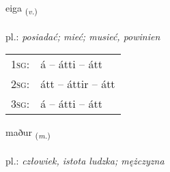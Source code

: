 \documentclass[frontgrid, backgrid]{flacards}\usepackage[]{graphicx}\usepackage[]{xcolor}
\begin{document}
{eiga \small{\textsubscript{(\textit{v.})}} \\[1ex] %
\textphonetic{[eiːɣa]} \\
pl.: \emph{posiadać; mieć; musieć, powinien} \\  [2ex]
\renewcommand*{\arraystretch}{0.8}
\begin{tabular}{p{1cm}l}
\textsc{1sg}: & á -- átti -- átt \\ 
\textsc{2sg}: & átt -- áttir -- átt \\ 
\textsc{3sg}: & á -- átti -- átt \\ 
\end{tabular}
}

\renewcommand{\flhead}{\vskip5pt \fboxsep=0pt {\small\bfseries\footnotesize Nafnorð | Noun}}
\renewcommand{\fcfoot}{\vskip5pt \fboxsep=0pt \hspace{2pt}{\small\bfseries\footnotesize 1K}}

\renewcommand{\blhead}{\vskip5pt {\small\bfseries\footnotesize Nafnorð | Noun }}
\renewcommand{\bcfoot}{\vskip5pt \hspace{2pt}{\small\bfseries\footnotesize 1K}}


{maður \small{\textsubscript{(\textit{m.})}} \\[1ex] %
\textphonetic{[maːðʏr]} \\
pl.: \emph{człowiek, istota ludzka; mężczyzna} \\  [2ex]
\renewcommand*{\arraystretch}{0.8}
}


\renewcommand{\flhead}{\vskip5pt \fboxsep=0pt {\small\bfseries\footnotesize Forsetning | Preposition}}
\renewcommand{\fcfoot}{\vskip5pt \fboxsep=0pt \hspace{2pt}{\small\bfseries\footnotesize 1K}}
\end{document}
